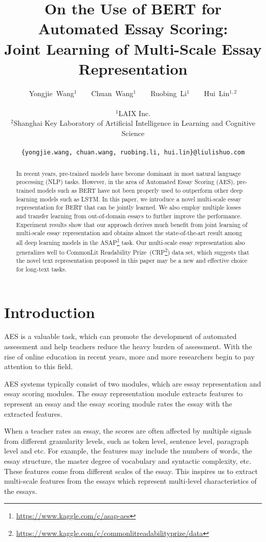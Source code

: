 \documentclass[11pt]{article}
\title{On the Use of BERT for Automated Essay Scoring:\\ Joint Learning of Multi-Scale Essay Representation}
\author{
Yongjie~Wang$^1$~~~~Chuan~Wang$^1$~~~~Ruobing~Li$^1$~~~~Hui~Lin$^{1,2}$\\\\
$^1$LAIX Inc.\\
$^2$Shanghai Key Laboratory of Artificial Intelligence in Learning and Cognitive Science \\\\
\texttt{\{yongjie.wang, chuan.wang, ruobing.li, hui.lin\}@liulishuo.com} 
}
\date{}
\begin{document}
\maketitle
\begin{abstract}
In recent years, pre-trained models have become dominant in most natural language processing (NLP) tasks.
However, in the area of Automated Essay Scoring (AES), pre-trained models such as BERT have not been properly used to outperform other deep learning models such as LSTM.
In this paper, we introduce a novel multi-scale essay representation for BERT that can be jointly learned.
We also employ multiple losses and transfer learning from out-of-domain essays to further improve the performance.
Experiment results show that our approach derives much benefit from joint learning of multi-scale essay representation and obtains almost the state-of-the-art result among all deep learning models in the ASAP\footnote{\url{https://www.kaggle.com/c/asap-aes}} task.
Our multi-scale essay representation also generalizes well to CommonLit Readability Prize~(CRP\footnote{\url{https://www.kaggle.com/c/commonlitreadabilityprize/data}}) data set, which suggests that the novel text representation proposed in this paper may be a new and effective choice for long-text tasks.\end{abstract}

\section{Introduction}

AES is a valuable task, which can promote the development of automated assessment and help teachers reduce the heavy burden of assessment.
With the rise of online education in recent years, more and more researchers begin to pay attention to this field.

AES systems typically consist of two modules, which are essay representation and essay scoring modules. The essay representation module extracts features to represent an essay and the essay scoring module rates the essay with the extracted features.


When a teacher rates an essay, the scores are often affected by multiple signals from different granularity levels, such as token level, sentence level, paragraph level and etc.
For example, the features may include the numbers of words, the essay structure, the master degree of vocabulary and syntactic complexity, etc.
These features come from different scales of the essay.
This inspires us to extract multi-scale features from the essays which represent multi-level characteristics of the essays.
\end{document}
